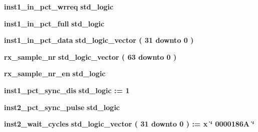 \begin{DoxyCompactItemize}
\item 
{\bf inst1\+\_\+in\+\_\+pct\+\_\+wrreq} {\bfseries \textcolor{comment}{std\+\_\+logic}\textcolor{vhdlchar}{ }} 
\item 
{\bf inst1\+\_\+in\+\_\+pct\+\_\+full} {\bfseries \textcolor{comment}{std\+\_\+logic}\textcolor{vhdlchar}{ }} 
\item 
{\bf inst1\+\_\+in\+\_\+pct\+\_\+data} {\bfseries \textcolor{comment}{std\+\_\+logic\+\_\+vector}\textcolor{vhdlchar}{ }\textcolor{vhdlchar}{(}\textcolor{vhdlchar}{ }\textcolor{vhdlchar}{ } \textcolor{vhdldigit}{31} \textcolor{vhdlchar}{ }\textcolor{keywordflow}{downto}\textcolor{vhdlchar}{ }\textcolor{vhdlchar}{ } \textcolor{vhdldigit}{0} \textcolor{vhdlchar}{ }\textcolor{vhdlchar}{)}\textcolor{vhdlchar}{ }} 
\item 
{\bf rx\+\_\+sample\+\_\+nr} {\bfseries \textcolor{comment}{std\+\_\+logic\+\_\+vector}\textcolor{vhdlchar}{ }\textcolor{vhdlchar}{(}\textcolor{vhdlchar}{ }\textcolor{vhdlchar}{ } \textcolor{vhdldigit}{63} \textcolor{vhdlchar}{ }\textcolor{keywordflow}{downto}\textcolor{vhdlchar}{ }\textcolor{vhdlchar}{ } \textcolor{vhdldigit}{0} \textcolor{vhdlchar}{ }\textcolor{vhdlchar}{)}\textcolor{vhdlchar}{ }} 
\item 
{\bf rx\+\_\+sample\+\_\+nr\+\_\+en} {\bfseries \textcolor{comment}{std\+\_\+logic}\textcolor{vhdlchar}{ }} 
\item 
{\bf inst1\+\_\+pct\+\_\+sync\+\_\+dis} {\bfseries \textcolor{comment}{std\+\_\+logic}\textcolor{vhdlchar}{ }\textcolor{vhdlchar}{ }\textcolor{vhdlchar}{\+:}\textcolor{vhdlchar}{=}\textcolor{vhdlchar}{ }\textcolor{vhdlchar}{ }\textcolor{vhdlchar}{\textquotesingle{}}\textcolor{vhdlchar}{ } \textcolor{vhdldigit}{1} \textcolor{vhdlchar}{ }\textcolor{vhdlchar}{\textquotesingle{}}\textcolor{vhdlchar}{ }} 
\item 
{\bf inst2\+\_\+pct\+\_\+sync\+\_\+pulse} {\bfseries \textcolor{comment}{std\+\_\+logic}\textcolor{vhdlchar}{ }} 
\item 
{\bf inst2\+\_\+wait\+\_\+cycles} {\bfseries \textcolor{comment}{std\+\_\+logic\+\_\+vector}\textcolor{vhdlchar}{ }\textcolor{vhdlchar}{(}\textcolor{vhdlchar}{ }\textcolor{vhdlchar}{ } \textcolor{vhdldigit}{31} \textcolor{vhdlchar}{ }\textcolor{keywordflow}{downto}\textcolor{vhdlchar}{ }\textcolor{vhdlchar}{ } \textcolor{vhdldigit}{0} \textcolor{vhdlchar}{ }\textcolor{vhdlchar}{)}\textcolor{vhdlchar}{ }\textcolor{vhdlchar}{ }\textcolor{vhdlchar}{ }\textcolor{vhdlchar}{\+:}\textcolor{vhdlchar}{=}\textcolor{vhdlchar}{ }\textcolor{vhdlchar}{ }\textcolor{vhdlchar}{x}\textcolor{vhdlchar}{ }\textcolor{keyword}{\char`\"{} 0000186\+A \char`\"{}}\textcolor{vhdlchar}{ }} 

\end{DoxyCompactItemize}
